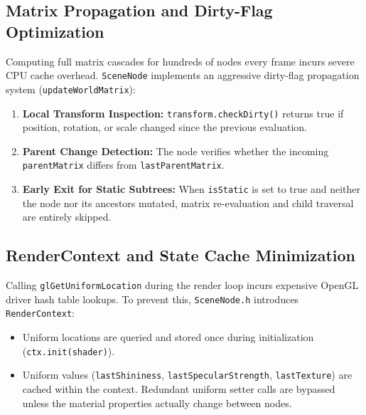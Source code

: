 \subsection{Matrix Propagation and Dirty-Flag Optimization}
Computing full matrix cascades for hundreds of nodes every frame incurs severe CPU cache overhead. \texttt{SceneNode} implements an aggressive dirty-flag propagation system (\texttt{updateWorldMatrix}):
\begin{enumerate}
    \item \textbf{Local Transform Inspection:} \texttt{transform.checkDirty()} returns true if position, rotation, or scale changed since the previous evaluation.
    \item \textbf{Parent Change Detection:} The node verifies whether the incoming \texttt{parentMatrix} differs from \texttt{lastParentMatrix}.
    \item \textbf{Early Exit for Static Subtrees:} When \texttt{isStatic} is set to true and neither the node nor its ancestors mutated, matrix re-evaluation and child traversal are entirely skipped.
\end{enumerate}

\subsection{RenderContext and State Cache Minimization}
Calling \texttt{glGetUniformLocation} during the render loop incurs expensive OpenGL driver hash table lookups. To prevent this, \texttt{SceneNode.h} introduces \texttt{RenderContext}:
\begin{itemize}
    \item Uniform locations are queried and stored once during initialization (\texttt{ctx.init(shader)}).
    \item Uniform values (\texttt{lastShininess}, \texttt{lastSpecularStrength}, \texttt{lastTexture}) are cached within the context. Redundant uniform setter calls are bypassed unless the material properties actually change between nodes.
\end{itemize}

